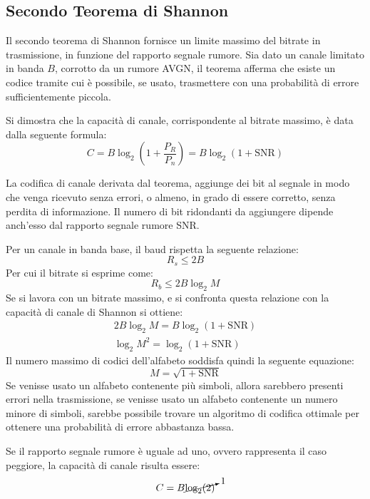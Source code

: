 \documentclass{article}
\numberwithin{equation}{subsection}
\begin{document}
\subsection{Secondo Teorema di Shannon}

Il secondo teorema di Shannon fornisce un limite massimo del bitrate in trasmissione, in funzione del rapporto segnale rumore. 
Sia dato un canale limitato in banda $B$, corrotto da un rumore AVGN, il teorema afferma che esiste un codice tramite cui è possibile, se usato, trasmettere con una 
probabilità di errore sufficientemente piccola. 

Si dimostra che la capacità di canale, corrispondente al bitrate massimo, è data dalla seguente formula:
\begin{equation}
    C=B\log_2\left(\displaystyle1+\frac{P_R}{P_n}\right)=B\log_2(1+\mathrm{SNR})
\end{equation}

La codifica di canale derivata dal teorema, aggiunge dei bit al segnale in modo che venga ricevuto senza errori, o almeno, in grado di essere corretto, senza perdita di 
informazione. Il numero di bit ridondanti da aggiungere dipende anch'esso dal rapporto segnale rumore SNR. 

Per un canale in banda base, il baud rispetta la seguente relazione:
\begin{equation*}
    R_s\leq 2B
\end{equation*}
Per cui il bitrate si esprime come:
\begin{equation*}
    R_b\leq 2B\log_2M
\end{equation*}
Se si lavora con un bitrate massimo, e si confronta questa relazione con la capacità di canale di Shannon si ottiene:
\begin{gather*}
    2B\log_2M=B\log_2(1+\mathrm{SNR})\\
    \log_2M^2=\log_2(1+\mathrm{SNR})
\end{gather*}
Il numero massimo di codici dell'alfabeto soddisfa quindi la seguente equazione:
\begin{equation}
    M=\sqrt{1+\mathrm{SNR}}
\end{equation}
Se venisse usato un alfabeto contenente più simboli, allora sarebbero presenti errori nella trasmissione, se venisse usato un alfabeto contenente un numero minore di simboli, 
sarebbe possibile trovare un algoritmo di codifica ottimale per ottenere una probabilità di errore abbastanza bassa. 


Se il rapporto segnale rumore è uguale ad uno, ovvero rappresenta il caso peggiore, la capacità di canale risulta essere:
\begin{gather*}
    C=B\cancelto{1}{\log_2(2)}
\end{gather*}
\end{document}
